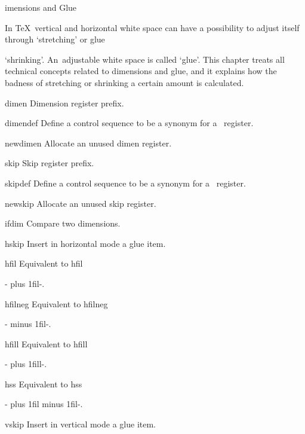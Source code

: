 \subject[glue]  Dimensions and Glue

In \TeX\ vertical and horizontal white space
can have a possibility to adjust itself through `stretching' or
\term glue\par
`shrinking'. An~adjustable white space is called `glue'.
This chapter treats all technical concepts related to
dimensions and glue, and it explains how the badness of stretching or shrinking
a  certain amount is calculated.


\invent
\item dimen 
      Dimension register prefix.

\item dimendef 
      Define a control sequence to be a synonym for
      a~ register.

\item newdimen 
      Allocate an unused dimen register. 

\item skip 
      Skip register prefix.

\item skipdef 
      Define a control sequence to be a synonym for
      a~ register.

\item newskip
      Allocate an unused skip register.

\item ifdim 
      Compare two dimensions. 

\item hskip  
      Insert in horizontal mode a glue item.

\item hfil 
      Equivalent to 
      \csterm hfil\par
      \ver-\hskip 0cm plus 1fil-.

\item hfilneg 
      Equivalent to 
      \csterm hfilneg\par
      \ver-\hskip 0cm minus 1fil-.

\item hfill 
      Equivalent to 
      \csterm hfill\par
      \ver-\hskip 0cm plus 1fill-.

\item hss 
      Equivalent to 
      \csterm hss\par
      \ver-\hskip 0cm plus 1fil minus 1fil-.

\item vskip  
      Insert in vertical mode a glue item.


